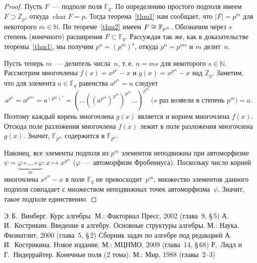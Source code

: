 \documentclass[a4paper,10pt]{amsart}
\newcommand{\xar}{\mathop{\mathrm{char}}}
\def\FF{{\mathbb F}}%
\def\ZZ{{\mathbb Z}}%
\def\NN{{\mathbb N}}%
\theoremstyle{definition}
\theoremstyle{remark}
\begin{document}
\begin{proof}
Пусть $F$~--- подполе поля $\FF_q$. По определению простого подполя
имеем $F \supset \ZZ_p$, откуда $\xar F = p$. Тогда
теорема~\ref{thm1} нам сообщает, что $|F| = p^m$ для некоторого $m
\in \NN$. По теореме~\ref{thm2} имеем $F \cong\nobreak \FF_{p^m}$.
Обозначим через $s$ степень (конечного) расширения $F \subset
\FF_q$. Рассуждая так же, как в доказательстве теоремы~\ref{thm1},
мы получим $p^n = (p^m)^s$, откуда $p^n = p^{ms}$ и $m$ делит~$n$.

Пусть теперь $m$~--- делитель числа~$n$, т.\,е. $n = ms$ для
некоторого $s \in \NN$. Рассмотрим многочлены $f(x) = x^{p^n} - x$ и
$g(x) = x^{p^m} - x$ над $\ZZ_p$. Заметим, что для элемента $a \in
\FF_q$ равенства $a^{p^m} = a$ следует
$$
a^{p^n} = a^{p^{ms}} = a^{(p^m)^s} =
(\ldots((a^{p^m})^{p^m})^{p^m}\ldots)^{p^m} \ \text{($s$ раз возвели
в степень $p^m$)} = a.
$$
Поэтому каждый корень многочлена $g(x)$ является и корнем многочлена
$f(x)$. Отсюда поле разложения многочлена $f(x)$ лежит в поле
разложения многочлена $g(x)$. Значит, $\FF_{p^m}$ содержится в
$\FF_{p^n}$.

Наконец, все элементы подполя из $p^m$ элементов неподвижны при
автоморфизме $\psi = \underbrace{\varphi \circ \ldots \circ
\varphi}_m \colon x \mapsto x^{p^m}$ ($\varphi$~--- автоморфизм
Фробениуса). Поскольку число корней многочлена $x^{p^m}-x$ в поле
$\FF_q$ не превосходит~$p^m$, множество элементов данного подполя
совпадает с множеством неподвижных точек автоморфизма~$\psi$.
Значит, такое подполе единственно.
\end{proof}

\bigskip

\begin{thebibliography}{99}
Э.\,Б.~Винберг. Курс алгебры. М.: Факториал Пресс, 2002 (глава~9,
\S\,5)
А.\,И.~Кострикин. Введение в алгебру. Основные структуры алгебры.
М.: Наука. Физматлит, 2000 (глава~5, \S\,2)
Сборник задач по алгебре под редакцией А.\,И.~Кострикина. Новое
издание. М.: МЦНМО, 2009 (глава~14, \S\,68)
Р.~Лидл и Г.~Нидеррайтер. Конечные поля (2 тома). М.: Мир, 1988
(главы~2--3)
\end{thebibliography}
\end{document}
